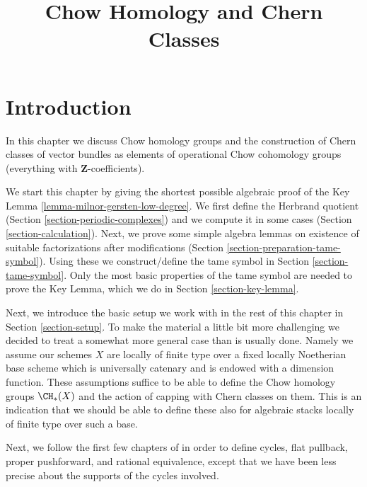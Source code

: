 

%


\title{Chow Homology and Chern Classes}

\maketitle

\label{section-phantom}


\tableofcontents


\section{Introduction}
\label{section-introduction}

\noindent
In this chapter we discuss Chow homology groups and the construction
of Chern classes of vector bundles as elements of operational
Chow cohomology groups (everything with $\mathbf{Z}$-coefficients).

\medskip\noindent
We start this chapter by giving the shortest possible
algebraic proof of the Key Lemma \ref{lemma-milnor-gersten-low-degree}.
We first define the Herbrand quotient
(Section \ref{section-periodic-complexes})
and we compute it in some cases
(Section \ref{section-calculation}).
Next, we prove some simple algebra lemmas on
existence of suitable factorizations after modifications
(Section \ref{section-preparation-tame-symbol}).
Using these we construct/define the tame symbol in
Section \ref{section-tame-symbol}.
Only the most basic properties of the tame symbol
are needed to prove the Key Lemma, which we do
in Section \ref{section-key-lemma}.

\medskip\noindent
Next, we introduce the basic setup we work with in the rest of this
chapter in Section \ref{section-setup}. To make the material a little
bit more challenging we decided to treat a somewhat more general case
than is usually done. Namely we assume our schemes $X$ are locally of
finite type over a fixed locally Noetherian base scheme which is universally
catenary and is endowed with a dimension function. These assumptions suffice
to be able to define the Chow homology groups $\CH_*(X)$ and the action of
capping with Chern classes on them. This is an indication that we should
be able to define these also for algebraic stacks locally of finite type
over such a base.

\medskip\noindent
Next, we follow the first few chapters of \cite{F} in order to define
cycles, flat pullback, proper pushforward, and rational equivalence,
except that we have been less precise about the supports of the cycles
involved.

